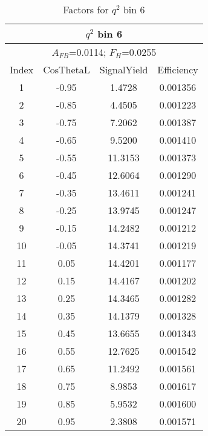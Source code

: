 \begin{table*}[htbH]
  \begin{center}
  \caption{Factors for $q^2$ bin 6 
  \label{tab:factors_bin6}}
  \small
  \begin{tabular}{|c||c|c|c|}
    \hline
    \multicolumn{4}{|c|}{$q^2$ bin 6} \\ 
    \hline
    \multicolumn{4}{|c|}{$A_{FB}$=0.0114;   $F_{H}$=0.0255} \\ 
    \hline
    Index & CosThetaL & SignalYield & Efficiency \\ 
    \hline
    1 & -0.95 & 1.4728 & 0.001356 \\ 
    2 & -0.85 & 4.4505 & 0.001223 \\ 
    3 & -0.75 & 7.2062 & 0.001387 \\ 
    4 & -0.65 & 9.5200 & 0.001410 \\ 
    5 & -0.55 & 11.3153 & 0.001373 \\ 
    6 & -0.45 & 12.6064 & 0.001290 \\ 
    7 & -0.35 & 13.4611 & 0.001241 \\ 
    8 & -0.25 & 13.9745 & 0.001247 \\ 
    9 & -0.15 & 14.2482 & 0.001212 \\ 
    10 & -0.05 & 14.3741 & 0.001219 \\ 
    11 & 0.05 & 14.4201 & 0.001177 \\ 
    12 & 0.15 & 14.4167 & 0.001202 \\ 
    13 & 0.25 & 14.3465 & 0.001282 \\ 
    14 & 0.35 & 14.1379 & 0.001328 \\ 
    15 & 0.45 & 13.6655 & 0.001343 \\ 
    16 & 0.55 & 12.7625 & 0.001542 \\ 
    17 & 0.65 & 11.2492 & 0.001561 \\ 
    18 & 0.75 & 8.9853 & 0.001617 \\ 
    19 & 0.85 & 5.9532 & 0.001600 \\ 
    20 & 0.95 & 2.3808 & 0.001571 \\ 
    \hline
  \end{tabular}
  \end{center}
\end{table*}


